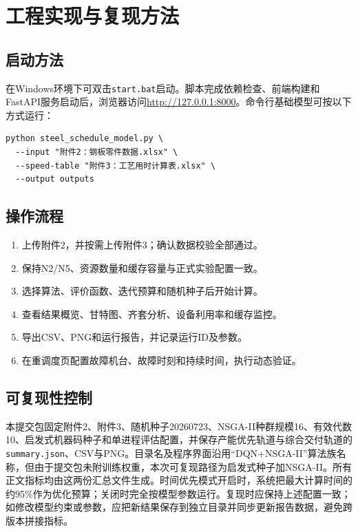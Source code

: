 \documentclass[UTF8,zihao=-4,openany]{ctexrep}
\newcommand{\code}[1]{\texttt{#1}}
\begin{document}
\chapter{工程实现与复现方法}

\section{启动方法}

在Windows环境下可双击\code{start.bat}启动。脚本完成依赖检查、前端构建和FastAPI服务启动后，浏览器访问\url{http://127.0.0.1:8000}。命令行基础模型可按以下方式运行：

\begin{verbatim}
python steel_schedule_model.py \
  --input "附件2：钢板零件数据.xlsx" \
  --speed-table "附件3：工艺用时计算表.xlsx" \
  --output outputs
\end{verbatim}

\section{操作流程}

\begin{enumerate}
  \item 上传附件2，并按需上传附件3；确认数据校验全部通过。
  \item 保持N2/N5、资源数量和缓存容量与正式实验配置一致。
  \item 选择算法、评价函数、迭代预算和随机种子后开始计算。
  \item 查看结果概览、甘特图、齐套分析、设备利用率和缓存监控。
  \item 导出CSV、PNG和运行报告，并记录运行ID及参数。
  \item 在重调度页配置故障机台、故障时刻和持续时间，执行动态验证。
\end{enumerate}

\section{可复现性控制}

本提交包固定附件2、附件3、随机种子20260723、NSGA-II种群规模16、有效代数10、启发式机器码种子和单进程评估配置，并保存产能优先轨道与综合交付轨道的\code{summary.json}、CSV与PNG。目录名及程序界面沿用“DQN+NSGA-II”算法族名称，但由于提交包未附训练权重，本次可复现路径为启发式种子加NSGA-II。所有正文指标均由这两份汇总文件生成。时间优先模式开启时，系统把最大计算时间的约95\%作为优化预算；关闭时完全按模型参数运行。复现时应保持上述配置一致；如修改模型约束或参数，应把新结果保存到独立目录并同步更新报告数据，避免跨版本拼接指标。
\end{document}
